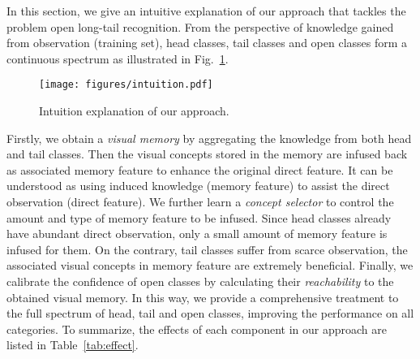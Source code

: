 \documentclass[10pt,twocolumn,letterpaper]{article}
\begin{document}
In this section, we give an intuitive explanation of our approach that tackles the problem open long-tail recognition.
From the perspective of knowledge gained from observation (\ie training set), head classes, tail classes and open classes form a continuous spectrum as illustrated in Fig.~\ref{fig:intuition}.

\begin{figure}[h]
  \centering
  \texttt{[image: figures/intuition.pdf]}
  \vspace{-6pt}
  \caption{Intuition explanation of our approach.}
  \label{fig:intuition}
\end{figure}

\begin{table}[h]
    \centering
    \vspace{-6pt}
    \caption{The effects of each component in our approach.}
    \label{tab:effect}
\end{table}

Firstly, we obtain a \emph{visual memory} by aggregating the knowledge from both head and tail classes.
Then the visual concepts stored in the memory are infused back as associated memory feature to enhance the original direct feature.
It can be understood as using induced knowledge (\ie memory feature) to assist the direct observation (\ie direct feature).
We further learn a \emph{concept selector} to control the amount and type of memory feature to be infused.
Since head classes already have abundant direct observation, only a small amount of memory feature is infused for them.
On the contrary, tail classes suffer from scarce observation, the associated visual concepts in memory feature are extremely beneficial.
Finally, we calibrate the confidence of open classes by calculating their \emph{reachability} to the obtained visual memory.
In this way, we provide a comprehensive treatment to the full spectrum of head, tail and open classes, improving the performance on all categories.
To summarize, the effects of each component in our approach are listed in Table~\ref{tab:effect}.
\end{document}
